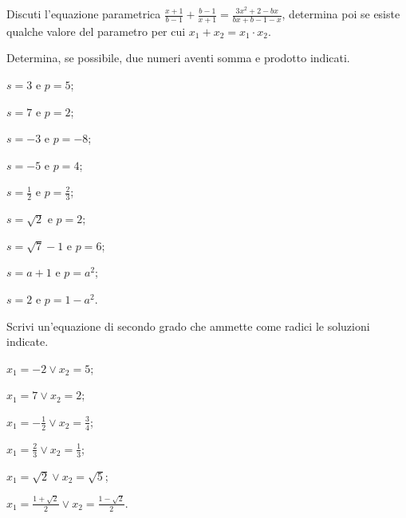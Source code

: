 \begin{esercizio}
 \label{ese:3.87}
Discuti l'equazione parametrica $\frac{x + 1}{b-1} + \frac{b-1}{x + 1}=\frac{3 x^{2} + 2-b x}{b x + b-1-x}$, determina poi se esiste qualche valore del parametro per cui $x_{1} + x_{2} = x_{1} \cdot x_{2}$.
\end{esercizio}
\pagebreak
\begin{esercizio}[\Ast]
 \label{ese:3.88}
Determina, se possibile, due numeri aventi somma e prodotto indicati.
\begin{multicols}{3}
\begin{enumeratea}
\item $s = 3 \text{ e } p = 5$;
\item $s = 7 \text{ e } p = 2$;
\item $s =-3 \text{ e } p =-8$;
\item $s =-5 \text{ e } p = 4$;
\item $s = \frac{1}{2} \text{ e } p = \frac{2}{3}$;
\item $s = \sqrt{2} \text{ e } p = 2$;
\item $s = \sqrt{7}-1 \text{ e } p = 6$;
\item $s = a + 1 \text{ e } p= a^{2}$;
\item $s = 2 \text{ e } p= 1-a^{2}$.
\end{enumeratea}
\end{multicols}
\end{esercizio}


\begin{esercizio}
 \label{ese:3.89}
Scrivi un'equazione di secondo grado che ammette come radici le soluzioni indicate.
\begin{multicols}{2}
\begin{enumeratea}
\item $x_{1} =-2 \vee x_{2} = 5$;
\item $x_{1} = 7 \vee x_{2} = 2$;
\item $x_{1} =-\frac{1}{2} \vee x_{2} = \frac{3}{4}$;
\item $x_{1} = \frac{2}{3} \vee x_{2} = \frac{1}{3}$;
\item $x_{1} = \sqrt{2} \vee x_{2} = \sqrt{5}$;
\item $x_{1} = \frac{1 + \sqrt{2}}{2} \vee x_{2} = \frac{1-\sqrt{2}}{2}$.
\end{enumeratea}
\end{multicols}
\end{esercizio}

